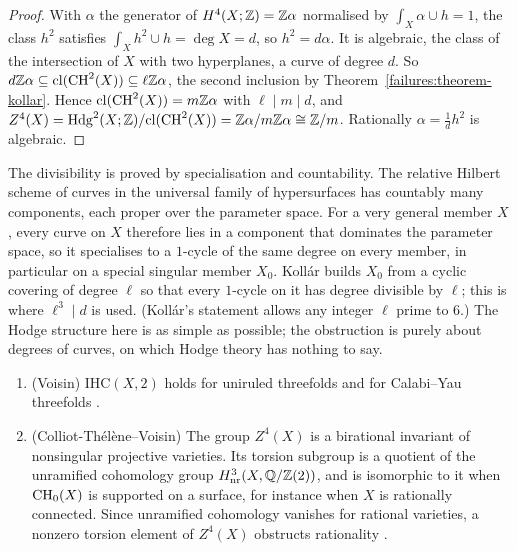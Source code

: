 \begin{proof}
With $\alpha$ the generator of $H^4(X; \mathbb{Z}) = \mathbb{Z}\alpha$ normalised by $\int_X\alpha \cup h = 1$, the class $h^2$ satisfies $\int_Xh^2 \cup h = \deg X = d$, so $h^2 = d\alpha$. It is algebraic, the class of the intersection of $X$
with two hyperplanes, a curve of degree $d$. So $d\mathbb{Z}\alpha \subseteq \mathrm{cl}(\operatorname{CH}^2(X)) \subseteq \ell\mathbb{Z}\alpha$, the second inclusion by Theorem~\ref{failures:theorem-kollar}. Hence
$\mathrm{cl}(\operatorname{CH}^2(X)) = m\mathbb{Z}\alpha$ with $\ell \mid m \mid d$, and $Z^4(X) = \mathrm{Hdg}^2(X; \mathbb{Z})/\mathrm{cl}(\operatorname{CH}^2(X)) = \mathbb{Z}\alpha/m\mathbb{Z}\alpha \cong \mathbb{Z}/m$. Rationally $\alpha = \frac1dh^2$ is algebraic.
\end{proof}

\begin{remark}\label{failures:remark-kollar-mechanism}
The divisibility is proved by specialisation and countability. The relative Hilbert scheme of curves in the universal family of hypersurfaces has countably many components, each proper over the
parameter space. For a very general member $X$, every curve on $X$ therefore lies in a component that dominates the parameter space, so it specialises to a $1$-cycle of the same degree on every
member, in particular on a special singular member $X_0$. Koll\'ar builds $X_0$ from a cyclic covering of degree $\ell$ so that every $1$-cycle on it has degree divisible by $\ell$; this is where
$\ell^3 \mid d$ is used. (Koll\'ar's statement allows any integer $\ell$ prime to $6$.) The Hodge structure here is as simple as possible; the obstruction is purely about degrees of curves, on which Hodge theory has nothing to say.
\end{remark}

\begin{theorem}\label{failures:theorem-what-survives}
\begin{enumerate}
\item (Voisin) $\mathrm{IHC}(X, 2)$ holds for uniruled threefolds and for Calabi--Yau threefolds \cite{voisin-2006}.
\item (Colliot-Th\'el\`ene--Voisin) The group $Z^4(X)$ is a birational invariant of nonsingular projective varieties. Its torsion subgroup is a quotient of the unramified cohomology group
$H^3_{\mathrm{nr}}(X, \mathbb{Q}/\mathbb{Z}(2))$, and is isomorphic to it when $\operatorname{CH}_0(X)$ is supported on a surface, for instance when $X$ is rationally connected. Since unramified cohomology vanishes for
rational varieties, a nonzero torsion element of $Z^4(X)$ obstructs rationality \cite{colliot-thelene-voisin-2012}.
\end{enumerate}
\end{theorem}

